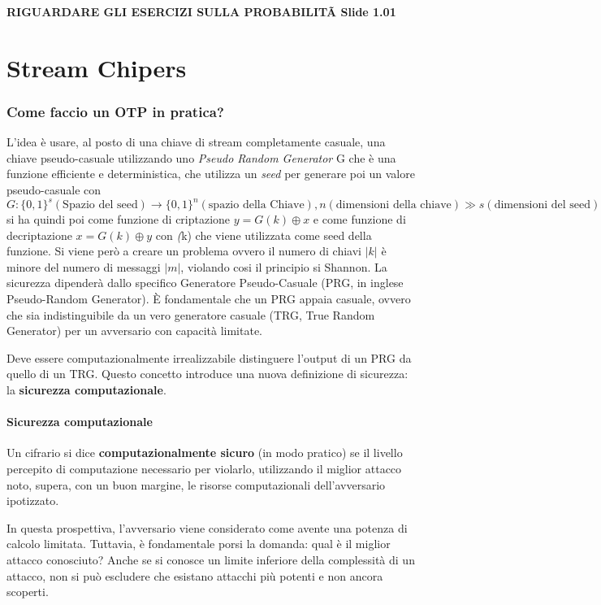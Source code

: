 \documentclass{report}
\begin{document}
\textbf{RIGUARDARE GLI ESERCIZI SULLA PROBABILITÃ Slide 1.01}



\section{Stream Chipers}
    \subsubsection{Come faccio un OTP in pratica?}
    L'idea è usare, al posto di una chiave di stream completamente casuale, una chiave pseudo-casuale utilizzando uno \textit{Pseudo Random Generator} G che è una funzione efficiente e deterministica, che utilizza un \textit{seed} per generare poi un valore pseudo-casuale con 
    \[G: \{0,1\}^s(\text{Spazio del seed}) \rightarrow \{0,1\}^n (\text{spazio della Chiave}), n (\text{dimensioni della chiave}) \gg s (\text{dimensioni del seed})\]
    si ha quindi poi come funzione di criptazione $y = G(k) \oplus x$  e come funzione di decriptazione $x = G(k) \oplus y$ con \textit(k) che viene utilizzata come seed della funzione. 
    Si viene però a creare un problema ovvero il numero di chiavi $|k|$ è minore del numero di messaggi $|m|$, violando cosi il principio si Shannon. 
    La sicurezza dipenderà dallo specifico Generatore Pseudo-Casuale (PRG, in inglese Pseudo-Random Generator). È fondamentale che un PRG appaia casuale, ovvero che sia indistinguibile da un vero generatore casuale (TRG, True Random Generator) per un avversario con capacità limitate.

Deve essere computazionalmente irrealizzabile distinguere l'output di un PRG da quello di un TRG. Questo concetto introduce una nuova definizione di sicurezza: la \textbf{sicurezza computazionale}.

\paragraph{Sicurezza computazionale}
Un cifrario si dice \textbf{computazionalmente sicuro} (in modo pratico) se il livello percepito di computazione necessario per violarlo, utilizzando il miglior attacco noto, supera, con un buon margine, le risorse computazionali dell’avversario ipotizzato.

In questa prospettiva, l'avversario viene considerato come avente una potenza di calcolo limitata. Tuttavia, è fondamentale porsi la domanda: qual è il miglior attacco conosciuto? Anche se si conosce un limite inferiore della complessità di un attacco, non si può escludere che esistano attacchi più potenti e non ancora scoperti.
\end{document}
